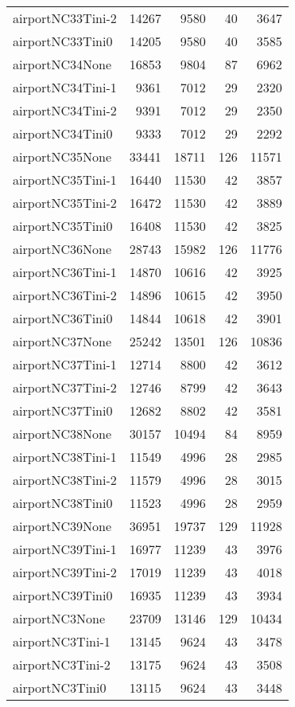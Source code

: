 \begin{longtable}{lrrrr}
airportNC33Tini-2 & 14267 & 9580 & 40 & 3647 \\
airportNC33Tini0 & 14205 & 9580 & 40 & 3585 \\
airportNC34None & 16853 & 9804 & 87 & 6962 \\
airportNC34Tini-1 & 9361 & 7012 & 29 & 2320 \\
airportNC34Tini-2 & 9391 & 7012 & 29 & 2350 \\
airportNC34Tini0 & 9333 & 7012 & 29 & 2292 \\
airportNC35None & 33441 & 18711 & 126 & 11571 \\
airportNC35Tini-1 & 16440 & 11530 & 42 & 3857 \\
airportNC35Tini-2 & 16472 & 11530 & 42 & 3889 \\
airportNC35Tini0 & 16408 & 11530 & 42 & 3825 \\
airportNC36None & 28743 & 15982 & 126 & 11776 \\
airportNC36Tini-1 & 14870 & 10616 & 42 & 3925 \\
airportNC36Tini-2 & 14896 & 10615 & 42 & 3950 \\
airportNC36Tini0 & 14844 & 10618 & 42 & 3901 \\
airportNC37None & 25242 & 13501 & 126 & 10836 \\
airportNC37Tini-1 & 12714 & 8800 & 42 & 3612 \\
airportNC37Tini-2 & 12746 & 8799 & 42 & 3643 \\
airportNC37Tini0 & 12682 & 8802 & 42 & 3581 \\
airportNC38None & 30157 & 10494 & 84 & 8959 \\
airportNC38Tini-1 & 11549 & 4996 & 28 & 2985 \\
airportNC38Tini-2 & 11579 & 4996 & 28 & 3015 \\
airportNC38Tini0 & 11523 & 4996 & 28 & 2959 \\
airportNC39None & 36951 & 19737 & 129 & 11928 \\
airportNC39Tini-1 & 16977 & 11239 & 43 & 3976 \\
airportNC39Tini-2 & 17019 & 11239 & 43 & 4018 \\
airportNC39Tini0 & 16935 & 11239 & 43 & 3934 \\
airportNC3None & 23709 & 13146 & 129 & 10434 \\
airportNC3Tini-1 & 13145 & 9624 & 43 & 3478 \\
airportNC3Tini-2 & 13175 & 9624 & 43 & 3508 \\
airportNC3Tini0 & 13115 & 9624 & 43 & 3448 \\

\end{longtable}
